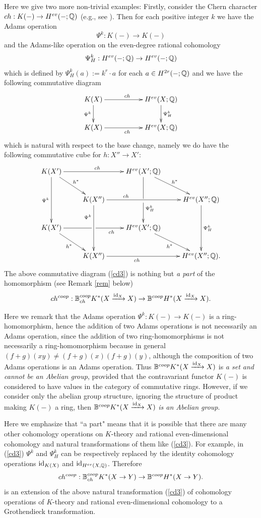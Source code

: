 \documentclass[a4paper]{amsart}
\begin{document}
Here we give two more non-trivial examples:
Firstly, consider the Chern character $ch: K(-) \to H^{ev}(-;\mathbb Q)$ (e.g., see \cite[\S 3 Properties]{nLab}). Then for each positive integer $k$ we have the Adams operation
$$\Psi^k: K(-) \to K(-)$$
and the Adams-like operation on the even-degree rational cohomology
$$\Psi^k_H:H^{ev}(-;\mathbb Q) \to H^{ev}(-;\mathbb Q)$$
which is defined by $\Psi^k_H(a):=k^r \cdot a$ for each $a \in H^{2r}(-;\mathbb Q)$
and we have the following commutative diagram
\begin{equation}\label{cd3}
\xymatrix
{K(X) \ar[d]_{\Psi^k} \ar[rr]^{ch} && H^{ev}(X;\bQ) \ar[d]^{\Psi^k_H}\\
K(X) \ar[rr]_{ch} && H^{ev}(X;\bQ)
}
\end{equation}
which is natural with respect to the base change, namely we do have the following commutative cube for $h:X'' \to X'$:
\begin{equation}\label{ccube2}
\xymatrix
{K(X') \ar[dd]_{\Psi^k} \ar[rd]^{h^*} \ar[rr]^{ch} && H^{ev}(X';\bQ) \ar'[d][dd]^(.3){\Psi^k_H} \ar[rd]^{h^*} \\
& K(X'') \ar[dd]_(.3){\Psi^k} \ar[rr]^(.3){ch}  &&  H^{ev}(X'';\bQ) \ar[dd]^{\Psi^k_H} \\
K(X') \ar'[r] [rr]_{ch \quad \quad }  \ar[rd]_{h^*} && H^{ev}(X';\bQ) \ar[rd]_{h^*} \\
& K(X'') \ar[rr] _{ch \quad \quad  \quad }  &&  H^{ev}(X'';\bQ).
}
\end{equation}
The above commutative diagram (\ref{cd3}) is nothing but \emph{a part} of the homomorphism (see Remark \ref{rem} below)
$$ch^{coop}: \mathbb B^{coop}_{ch}K^*(X \xrightarrow {\operatorname{id}_X} X) \to \mathbb B^{coop}H^*(X \xrightarrow {\operatorname{id}_X} X).$$
\begin{rem}\label{rem}
Here we remark that the Adams operation $\Psi^k: K(-) \to K(-)$ is a ring-homomorphism, hence the addition of two Adams operations is not necessarily an Adams operation, since the addition of two ring-homomorphisms is not necessarily a ring-homomorphism because in general $(f+g)(xy)\not = (f+g)(x)(f+g)(y)$, although the composition of two Adams operations is an Adams operation. Thus $\mathbb B^{coop}K^*(X \xrightarrow {\operatorname{id}_X} X)$ is \emph{a set and cannot be an Abelian group}, provided that the contravariant functor $K(-)$ is considered to have values in the category of commutative rings. However, if we consider only the abelian group structure, ignoring the structure of product making $K(-)$ a ring, then $\mathbb B^{coop}K^*(X \xrightarrow {\operatorname{id}_X} X)$ \emph{is an Abelian group}.
\end{rem}
Here we emphasize that ``a part" means that it is possible that there are many other cohomology operations on $K$-theory and rational even-dimensional cohomology and natural transformations of them like (\ref{cd3}). 
For example, in (\ref{cd3}) $\Psi^k$ and $\Psi^k_H$ can be respectively replaced by the identity cohomology operations 
$\operatorname{id}_{K(X)}$ and $\operatorname{id}_{H^{ev}(X, \mathbb Q)}$.
Therefore 
$$ch^{coop}: \mathbb B^{coop}_{ch}K^*(X \to Y) \to \mathbb B^{coop}H^*(X \to Y).$$
is an extension of the above natural transformation (\ref{cd3}) of cohomology operations of $K$-theory and rational even-dimensional cohomology to a Grothendieck transformation.
\end{document}
